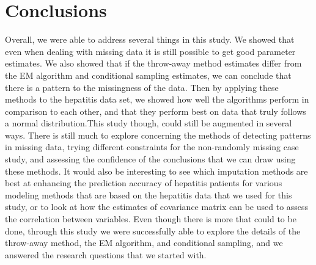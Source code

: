 \documentclass{svproc}
\begin{document}
\pagebreak

\section{Conclusions}
Overall, we were able to address several things in this study. We showed that even when dealing with missing data it is still possible to get good parameter estimates. We also showed that if the throw-away method estimates differ from the EM algorithm and conditional sampling estimates, we can conclude that there is a pattern to the missingness of the data. Then by applying these methods to the hepatitis data set, we showed how well the algorithms perform in comparison to each other, and that they perform best on data that truly follows a normal distribution.This study though, could still be augmented in several ways. There is still much to explore concerning the methods of detecting patterns in missing data, trying different constraints for the non-randomly missing case study, and assessing the confidence of the conclusions that we can draw using these methods. It would also be interesting to see which imputation methods are best at enhancing the prediction accuracy of hepatitis patients for various modeling methods that are based on the hepatitis data that we used for this study, or to look at how the estimates of covariance matrix can be used to assess the correlation between variables. Even though there is more that could to be done, through this study we were successfully able to explore the details of the throw-away method, the EM algorithm, and conditional sampling, and we answered the research questions that we started with. 






%
\end{document}
